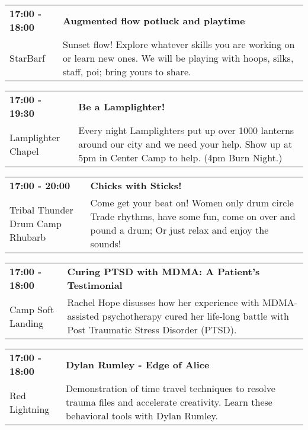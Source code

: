 \begin{tabular}{ p{1in} p{2.2in} }
    \textbf{17:00 - 18:00} & \textbf{Augmented flow potluck and playtime} \\
    StarBarf \newline  & Sunset flow! Explore whatever skills you are working on or learn new ones. We will be playing with hoops, silks, staff, poi; bring yours to share. \\
    \hline 
\end{tabular}
    
\begin{tabular}{ p{1in} p{2.2in} }
    \textbf{17:00 - 19:30} & \textbf{Be a Lamplighter!} \\
    Lamplighter Chapel \newline  & Every night Lamplighters put up over 1000 lanterns around our city and we need your help. Show up at 5pm in Center Camp to help. (4pm Burn Night.) \\
    \hline 
\end{tabular}
    
\begin{tabular}{ p{1in} p{2.2in} }
    \textbf{17:00 - 20:00} & \textbf{Chicks with Sticks! } \\
    Tribal Thunder Drum Camp \newline Rhubarb & Come get your beat on! Women only drum circle~ Trade rhythms, have some fun, come on over and pound a drum; Or just relax and enjoy the sounds! \\
    \hline 
\end{tabular}
    
\begin{tabular}{ p{1in} p{2.2in} }
    \textbf{17:00 - 18:00} & \textbf{Curing PTSD with MDMA: A Patient's Testimonial} \\
    Camp Soft Landing \newline  & Rachel Hope disusses how her experience with MDMA-assisted psychotherapy cured her life-long battle with Post Traumatic Stress Disorder (PTSD). \\
    \hline 
\end{tabular}
    
\begin{tabular}{ p{1in} p{2.2in} }
    \textbf{17:00 - 18:00} & \textbf{Dylan Rumley - Edge of Alice} \\
    Red Lightning \newline  & Demonstration of time travel techniques to resolve trauma files and accelerate creativity. Learn these behavioral tools with Dylan Rumley. \\
    \hline 
\end{tabular}
    
